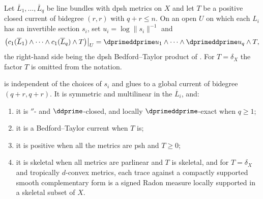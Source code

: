 \begin{definition}
\label{def:ch17-mixed-product}
Let $\overline L_1,\dots,\overline L_q$ be line bundles with dpsh metrics
on $X$ and let $T$ be a positive closed current of bidegree $(r,r)$
with $q+r\le n$.  On an open $U$ on which each $L_i$ has an invertible
section $s_i$, set $u_i=\log\|s_i\|^{-1}$ and
\[
 \bigl(c_1(\overline L_1)\wedge\cdots\wedge c_1(\overline L_q)\wedge T
 \bigr)\big|_U
 =\dprimeddprime u_1\wedge\cdots\wedge\dprimeddprime u_q\wedge T,
\]
the right-hand side being the dpsh Bedford--Taylor product of
.  For $T=\delta_X$ the factor $T$ is
omitted from the notation.
\end{definition}

\begin{proposition}
\label{prop:ch17-product-welldefined}
 is independent of the choices of $s_i$ and
glues to a global current of bidegree $(q+r,q+r)$.  It is symmetric and
multilinear in the $\overline L_i$, and:
\begin{enumerate}
\item\label{itm:ch17-prod:closed}
 it is $\dprime$- and $\ddprime$-closed, and locally
 $\dprimeddprime$-exact when $q\ge1$;
\item\label{itm:ch17-prod:bt}
 it is a Bedford--Taylor current when $T$ is;
\item\label{itm:ch17-prod:pos}
 it is positive when all the metrics are psh and $T\ge0$;
\item\label{itm:ch17-prod:skel}
 it is skeletal when all metrics are parlinear and $T$ is skeletal, and
 for $T=\delta_X$ and tropically $d$-convex metrics, each trace
 against a compactly supported smooth complementary form is a signed
 Radon measure locally supported in a skeletal subset of $X$.
\end{enumerate}
\end{proposition}

